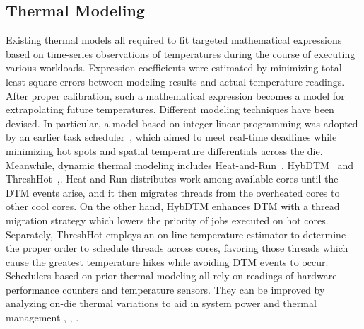 \documentclass[times, 10pt,twocolumn]{IEEEtran}
\begin{document}
\subsection{Thermal Modeling}
\label{sec:thermal-modeling}
Existing thermal models all required to fit targeted mathematical
expressions based on time-series observations of temperatures during the
course of executing various workloads.  Expression coefficients were
estimated by minimizing total least square errors between modeling
results and actual temperature readings.  After proper calibration, such
a mathematical expression becomes a model for extrapolating future
temperatures.  Different modeling techniques have been devised.  In
particular, a model based on integer linear programming was adopted by
an earlier task scheduler~\cite{Kursun2009}, which aimed to meet
real-time deadlines while minimizing hot spots and spatial temperature
differentials across the die.  Meanwhile, dynamic thermal modeling
includes Heat-and-Run~\cite{Gomaa2004}, HybDTM~\cite{Ayoub2011} and
ThreshHot~\cite{Yang2008},\cite{Bellosa2003}.  Heat-and-Run distributes
work among available cores until the DTM events arise, and it then
migrates threads from the overheated cores to other cool cores.  On the
other hand, HybDTM enhances DTM with a thread migration strategy which
lowers the priority of jobs executed on hot cores.  Separately,
ThreshHot employs an on-line temperature estimator to determine the
proper order to schedule threads across cores, favoring those threads
which cause the greatest temperature hikes while avoiding DTM events to
occur.  Schedulers based on prior thermal modeling all rely on readings
of hardware performance counters and temperature sensors.  They can be
improved by analyzing on-die thermal variations to aid in system power
and thermal management \cite{Kursun2009}, \cite{Bailis2011}, \cite{Murali2008}.
\end{document}
